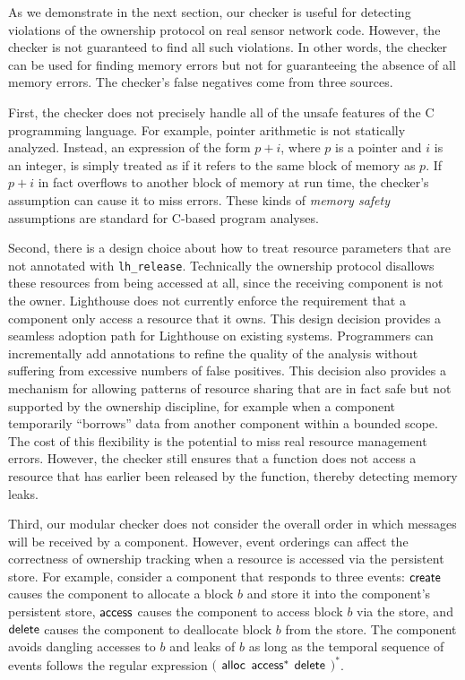 As we demonstrate in the next section, our checker is useful for
detecting violations of the ownership protocol on real sensor network
code.  However, the checker is not guaranteed to find all such
violations.  In other words, the checker can be used for finding
memory errors but not for guaranteeing the absence of all memory
errors.  The checker's false negatives come from three sources.

First, the checker does not precisely handle all of the unsafe
features of the C programming language.  For example, pointer
arithmetic is not statically analyzed.  Instead, an expression of the
form $p+i$, where $p$ is a pointer and $i$ is an integer, is simply
treated as if it refers to the same block of memory as $p$.  If $p+i$
in fact overflows to another block of memory at run time, the
checker's assumption can cause it to miss errors.  These kinds of
{\em memory safety} assumptions are standard for C-based program analyses.

Second, there is a design choice about how to treat resource
parameters that are not
annotated with {\tt lh\_release}.  Technically the
ownership protocol disallows these resources from being accessed at
all, since the receiving component is not the owner.  
%
Lighthouse does not currently enforce the requirement that a component
only access a resource that it owns.
% 
This design decision provides a seamless adoption path for Lighthouse
on existing systems.  Programmers can incrementally add
annotations to refine the quality of the analysis without
suffering from excessive numbers of false positives.
%
This decision also provides a mechanism for allowing patterns of resource
sharing that are in fact safe but not supported by the ownership
discipline, for example when a component temporarily ``borrows'' data from
another component within a bounded scope.
%
The cost of this flexibility is the potential to miss real resource
management errors.
%
However, the checker still ensures that a function does not access a
resource that has earlier been released by the function, thereby
detecting memory leaks.

Third, our modular checker does not consider the overall order in
which messages will be received by a component.  
%
However, event orderings
can affect the correctness of ownership tracking when a resource is
accessed via the persistent store.
%
For example, consider a component that responds to three events: ${\mathsf{create}}$
causes the component to allocate a block $b$ and store it into the
component's persistent store, ${\mathsf{access}}$ causes the component to access block
$b$ via the store, and ${\mathsf{delete}}$ causes the component to deallocate
block $b$ from the store.  
%
The component avoids dangling accesses to $b$ and leaks of $b$ 
as long as the temporal sequence
of events follows the regular expression $($ ${\mathsf{alloc}}$ ${\mathsf{access}}^*$
${\mathsf{delete}}$ $)^*$.  
%
%

